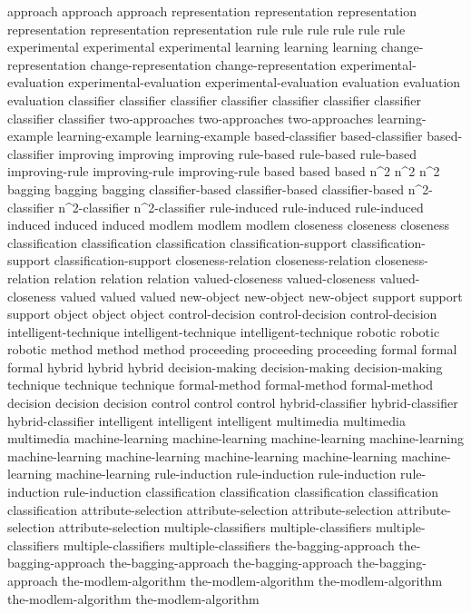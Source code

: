approach	approach	approach	
representation	representation	representation	representation	representation	representation	
rule	rule	rule	rule	rule	rule	
experimental	experimental	experimental	
learning	learning	learning	
change-representation	change-representation	change-representation	
experimental-evaluation	experimental-evaluation	experimental-evaluation	
evaluation	evaluation	evaluation	
classifier	classifier	classifier	classifier	classifier	classifier	classifier	classifier	classifier	
two-approaches	two-approaches	two-approaches	
learning-example	learning-example	learning-example	
based-classifier	based-classifier	based-classifier	
improving	improving	improving	
rule-based	rule-based	rule-based	
improving-rule	improving-rule	improving-rule	
based	based	based	
n^2	n^2	n^2	
bagging	bagging	bagging	
classifier-based	classifier-based	classifier-based	
n^2-classifier	n^2-classifier	n^2-classifier	
rule-induced	rule-induced	rule-induced	
induced	induced	induced	
modlem	modlem	modlem	
closeness	closeness	closeness	
classification	classification	classification	
classification-support	classification-support	classification-support	
closeness-relation	closeness-relation	closeness-relation	
relation	relation	relation	
valued-closeness	valued-closeness	valued-closeness	
valued	valued	valued	
new-object	new-object	new-object	
support	support	support	
object	object	object	
control-decision	control-decision	control-decision	
intelligent-technique	intelligent-technique	intelligent-technique	
robotic	robotic	robotic	
method	method	method	
proceeding	proceeding	proceeding	
formal	formal	formal	
hybrid	hybrid	hybrid	
decision-making	decision-making	decision-making	
technique	technique	technique	
formal-method	formal-method	formal-method	
decision	decision	decision	
control	control	control	
hybrid-classifier	hybrid-classifier	hybrid-classifier	
intelligent	intelligent	intelligent	
multimedia	multimedia	multimedia	
machine-learning	machine-learning	machine-learning	machine-learning	machine-learning	machine-learning	machine-learning	machine-learning	machine-learning	machine-learning	
rule-induction	rule-induction	rule-induction	rule-induction	rule-induction	
classification	classification	classification	classification	classification	
attribute-selection	attribute-selection	attribute-selection	attribute-selection	attribute-selection	
multiple-classifiers	multiple-classifiers	multiple-classifiers	multiple-classifiers	multiple-classifiers	
the-bagging-approach	the-bagging-approach	the-bagging-approach	the-bagging-approach	the-bagging-approach	
the-modlem-algorithm	the-modlem-algorithm	the-modlem-algorithm	the-modlem-algorithm	the-modlem-algorithm	
